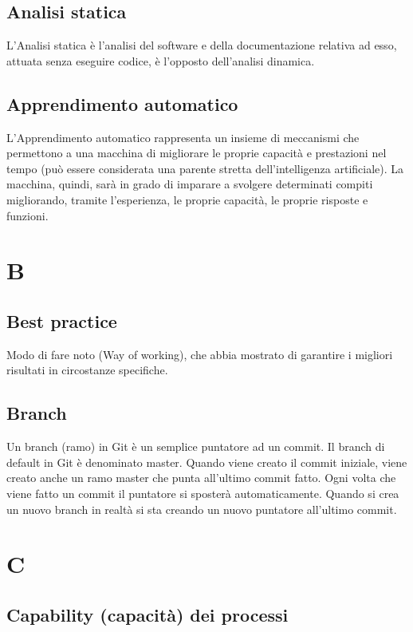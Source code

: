 	\subsection{Analisi statica}
L'Analisi statica è l'analisi del software e della documentazione relativa ad esso, attuata senza eseguire codice, è l'opposto dell'analisi dinamica.
	
	\subsection{Apprendimento automatico}
	
	L'Apprendimento automatico rappresenta un insieme di meccanismi che permettono a una macchina di migliorare le proprie capacità e prestazioni nel tempo (può essere considerata una parente stretta dell’intelligenza artificiale). La macchina, quindi, sarà in grado di imparare a svolgere determinati compiti migliorando, tramite l’esperienza, le proprie capacità, le proprie risposte e funzioni. 
	
	\section{B}
	
	\subsection{Best practice} 
	Modo di fare noto (Way of working), che abbia mostrato di garantire i migliori risultati in circostanze specifiche.
	
	\subsection{Branch} 
	Un branch (ramo) in Git è un semplice puntatore ad un commit. Il branch di default in Git è denominato master. Quando viene creato il commit iniziale, viene creato anche un ramo master che punta all'ultimo commit fatto. Ogni volta che viene fatto un commit il puntatore si sposterà automaticamente. Quando si crea un nuovo branch in realtà si sta creando un nuovo puntatore all'ultimo commit.
	
	\section{C}
	
	\subsection{Capability (capacità) dei processi}
	

